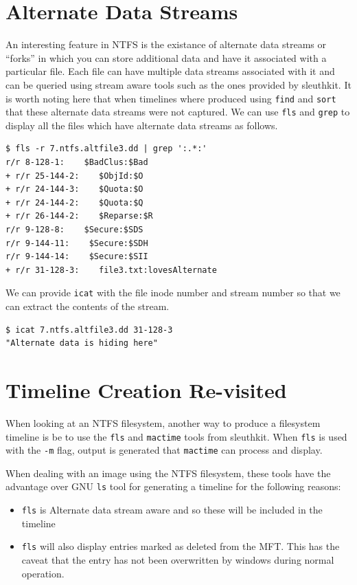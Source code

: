 \documentclass[a4paper,
    11pt,
    normalheadings,
    parindent,
    UKenglish,
    abstracton,
    ]{scrartcl}
\begin{document}
\section{Alternate Data Streams}
An interesting feature in NTFS is the existance of alternate data streams or ``forks'' in which you can store additional data and have it associated with a particular file. Each file can have multiple data streams associated with it and can be queried using stream aware tools such as the ones provided by sleuthkit. It is worth noting here that when timelines where produced using \texttt{find} and \texttt{sort} that these alternate data streams were not captured. We can use \texttt{fls} and \texttt{grep} to display all the files which have alternate data streams as follows.

\begin{verbatim}
$ fls -r 7.ntfs.altfile3.dd | grep ':.*:'
r/r 8-128-1:    $BadClus:$Bad
+ r/r 25-144-2:    $ObjId:$O
+ r/r 24-144-3:    $Quota:$O
+ r/r 24-144-2:    $Quota:$Q
+ r/r 26-144-2:    $Reparse:$R
r/r 9-128-8:    $Secure:$SDS
r/r 9-144-11:    $Secure:$SDH
r/r 9-144-14:    $Secure:$SII
+ r/r 31-128-3:    file3.txt:lovesAlternate
\end{verbatim}

We can provide \texttt{icat} with the file inode number and stream number so that we can extract the contents of the stream.

\begin{verbatim}
$ icat 7.ntfs.altfile3.dd 31-128-3
"Alternate data is hiding here"
\end{verbatim}


\section{Timeline Creation Re-visited}

When looking at an NTFS filesystem, another way to produce a filesystem timeline is be to use the \texttt{fls} and \texttt{mactime} tools from sleuthkit. When \texttt{fls} is used with the \texttt{-m} flag, output is generated that \texttt{mactime} can process and display.

When dealing with an image using the NTFS filesystem, these tools have the advantage over GNU \texttt{ls} tool for generating a timeline for the following reasons:

\begin{itemize}
        \item \texttt{fls} is Alternate data stream aware and so these will be included in the timeline
        \item \texttt{fls} will also display entries marked as deleted from the MFT. This has the caveat that the entry has not been overwritten by windows during normal operation.
\end{itemize}
\end{document}
